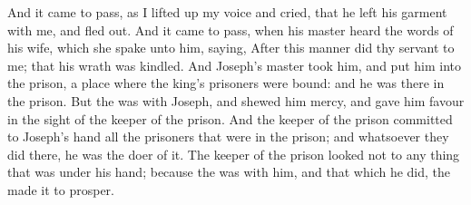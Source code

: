\begin{biblechapter}
\verse And it came to pass, as I lifted up my voice and cried, that he left his garment with me, and fled out.
\verse And it came to pass, when his master heard the words of his wife, which she spake unto him, saying, After this manner did thy servant to me; that his wrath was kindled.
\verse And Joseph's master took him, and put him into the prison, a place where the king's prisoners were bound: and he was there in the prison.
\verse But the \LORD was with Joseph, and shewed him mercy, and gave him favour in the sight of the keeper of the prison.
\verse And the keeper of the prison committed to Joseph's hand all the prisoners that were in the prison; and whatsoever they did there, he was the doer of it.
\verse The keeper of the prison looked not to any thing that was under his hand; because the \LORD was with him, and that which he did, the \LORD made it to prosper.
\end{biblechapter}

